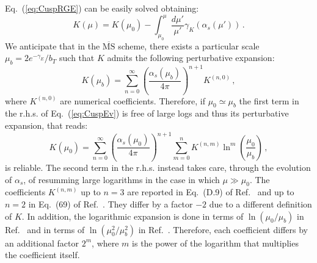 \documentclass[10pt,a4paper]{article}
\begin{document}
Eq.~(\ref{eq:CuspRGE}) can be easily solved obtaining:
\begin{equation}\label{eq:CuspEv}
K(\mu) = K(\mu_0) - \int_{\mu_0}^{\mu}\frac{d\mu'}{\mu'}\gamma_K(\alpha_s(\mu'))\,.
\end{equation}
We anticipate that in the $\overline{\mbox{MS}}$ scheme, there exists
a particular scale $\mu_b = 2e^{-\gamma_E}/b_T$ such that $K$ admits
the following perturbative expansion:
\begin{equation}
K(\mu_b) = \sum_{n=0}^{\infty}\left(\frac{\alpha_s(\mu_b)}{4\pi}\right)^{n+1}K^{(n,0)}\,,
\end{equation}
where $K^{(n,0)}$ are numerical coefficients. Therefore, if
$\mu_0\simeq \mu_b$ the first term in the r.h.s. of
Eq.~(\ref{eq:CuspEv}) is free of large logs and thus its perturbative
expansion, that reads:
\begin{equation}\label{eq:rapandimlog}
K(\mu_0) = \sum_{n=0}^{\infty}\left(\frac{\alpha_s(\mu_0)}{4\pi}\right)^{n+1}\sum_{m=0}^nK^{(n,m)}\ln^m\left(\frac{\mu_0}{\mu_b}\right)\,,
\end{equation}
is reliable. The second term in the r.h.s. instead takes care, through
the evolution of $\alpha_s$, of resumming large logarithms in the case
in which $\mu\gg \mu_0$. The coefficients $K^{(n,m)}$ up to $n=3$ are
reported in Eq.~(D.9) of Ref.~\cite{Echevarria:2016scs} and up to
$n=2$ in Eq.~(69) of Ref.~\cite{Collins:2017oxh}. They differ by a
factor $-2$ due to a different definition of $K$. In addition, the
logarithmic expansion is done in terms of $\ln(\mu_0/\mu_b)$ in
Ref.~\cite{Collins:2017oxh} and in terms of $\ln(\mu_0^2/\mu_b^2)$ in
Ref.~\cite{Echevarria:2016scs}. Therefore, each coefficient differs by
an additional factor $2^m$, where $m$ is the power of the logarithm
that multiplies the coefficient itself.
\end{document}
